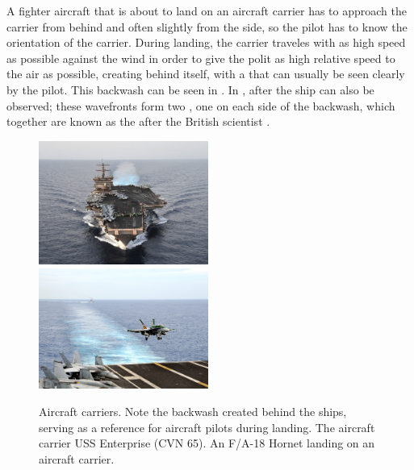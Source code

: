 A fighter aircraft that is about to land on an aircraft carrier has to approach the carrier from behind and often slightly from the side, so the pilot has to know the orientation of the carrier. During landing, the carrier traveles with as high speed as possible against the wind in order to give the polit as high relative speed to the air as possible, creating \wake behind itself, with a \backwash that can usually be seen clearly by the pilot. This backwash can be seen in . In ,  after the ship can also be observed; these wavefronts form two , one on each side of the backwash, which together are known as the  after the British scientist .

\begin{figure}
    \centering
    \subcaptionbox{\label{fig:aircraft_carrier_full_wake}} {\includegraphics[width=0.495\textwidth]{Images/Public_domain/The_aircraft_carrier_USS_Enterprise_(CVN_65)}}
    \subcaptionbox{\label{fig:aircraft_carrier_landing_backwash}} {\includegraphics[width=0.495\textwidth]{Images/Public_domain/An_F-A-18C_Hornet_lands_on_the_aircraft_carrier_USS_George_Washington_(CVN_73)}}
    \caption{Aircraft carriers. Note the backwash created behind the ships, serving as a reference for aircraft pilots during landing.  The aircraft carrier USS Enterprise (CVN 65).  An F/A-18 Hornet landing on an aircraft carrier.}
    \label{fig:aircraft_carriers_and_backwash}
\end{figure}

